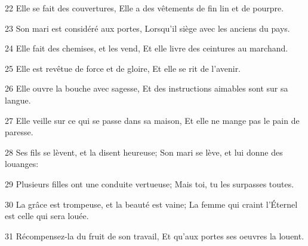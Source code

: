 \par 22 Elle se fait des couvertures, Elle a des vêtements de fin lin et de pourpre.
\par 23 Son mari est considéré aux portes, Lorsqu'il siège avec les anciens du pays.
\par 24 Elle fait des chemises, et les vend, Et elle livre des ceintures au marchand.
\par 25 Elle est revêtue de force et de gloire, Et elle se rit de l'avenir.
\par 26 Elle ouvre la bouche avec sagesse, Et des instructions aimables sont sur sa langue.
\par 27 Elle veille sur ce qui se passe dans sa maison, Et elle ne mange pas le pain de paresse.
\par 28 Ses fils se lèvent, et la disent heureuse; Son mari se lève, et lui donne des louanges:
\par 29 Plusieurs filles ont une conduite vertueuse; Mais toi, tu les surpasses toutes.
\par 30 La grâce est trompeuse, et la beauté est vaine; La femme qui craint l'Éternel est celle qui sera louée.
\par 31 Récompensez-la du fruit de son travail, Et qu'aux portes ses oeuvres la louent.


